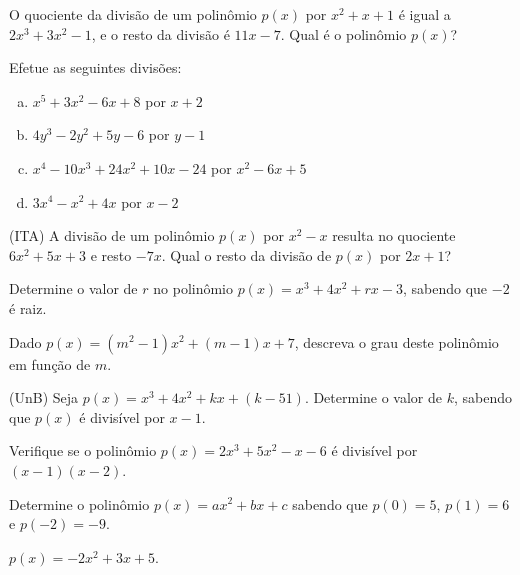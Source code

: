 \begin{secExercicios}
    \begin{exer}
        O quociente da divisão de um polinômio $p(x)$ por $x^2+x+1$ é igual a $2x^3+3x^2-1$, e o resto da divisão é $11x-7$. Qual é o polinômio $p(x)$?
    \end{exer}

    \begin{exer}
        Efetue as seguintes divisões:
        \begin{enumerate}[a)]
            \item $x^5+3x^2-6x+8$ por $x+2$
            \item $4y^3-2y^2+5y-6$ por $y-1$
            \item $x^4-10x^3+24x^2+10x-24$ por $x^2-6x+5$
            \item $3x^4-x^2+4x$ por $x-2$
        \end{enumerate}
    \end{exer}

    \begin{exer}
        (ITA) A divisão de um polinômio $p(x)$ por $x^2-x$ resulta no quociente $6x^2+5x+3$ e resto $-7x$. Qual o resto da divisão de $p(x)$ por $2x+1$?
    \end{exer}

    \begin{exer}
        Determine o valor de $r$ no polinômio $p(x)=x^3+4x^2+rx-3$, sabendo que $-2$ é raiz.
    \end{exer}

    \begin{exer}
        Dado $p(x)=(m^2-1)x^2+(m-1)x+7$, descreva o grau deste polinômio em função de $m$.
    \end{exer}

    \begin{exer}
        (UnB) Seja $p(x)=x^3+4x^2+kx+(k-51)$. Determine o valor de $k$, sabendo que $p(x)$ é divisível por $x-1$.
    \end{exer}

    \begin{exer}
        Verifique se o polinômio $p(x)=2x^3+5x^2-x-6$ é divisível por $(x-1)(x-2)$.
    \end{exer}

    \begin{exer}
        Determine o polinômio $p(x)=ax^2+bx+c$ sabendo que $p(0)=5$, $p(1)=6$ e $p(-2)=-9$.
    \end{exer}
    \begin{resp}
        $p(x)=-2x^2+3x+5$.
    \end{resp}


\end{secExercicios}
